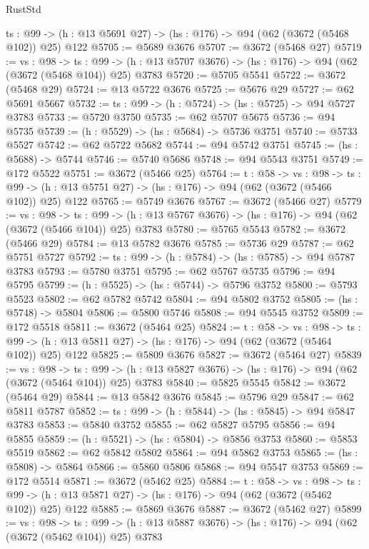 \begin{lexlean}{RustStd}
\begin{coremodule}
{\begin{coremodule}
{{{{{{{{{  {ts : @99} -> (h : @13 @5691 @27) -> (hs : @176) -> @94 (@62 (@3672 (@5468 @102)) @25) @122
@5705 := @5689 @3676
@5707 := @3672 (@5468 @27)
@5719 := {vs : @98} ->
  {ts : @99} -> (h : @13 @5707 @3676) -> (hs : @176) -> @94 (@62 (@3672 (@5468 @104)) @25) @3783
@5720 := @5705 @5541
@5722 := @3672 (@5468 @29)
@5724 := @13 @5722 @3676
@5725 := @5676 @29
@5727 := @62 @5691 @5667
@5732 := {ts : @99} -> (h : @5724) -> (hs : @5725) -> @94 @5727 @3783
@5733 := @5720 @3750
@5735 := @62 @5707 @5675
@5736 := @94 @5735
@5739 := (h : @5529) -> (hs : @5684) -> @5736 @3751
@5740 := @5733 @5527
@5742 := @62 @5722 @5682
@5744 := @94 @5742 @3751
@5745 := (hs : @5688) -> @5744
@5746 := @5740 @5686
@5748 := @94 @5543 @3751
@5749 := @172 @5522
@5751 := @3672 (@5466 @25)
@5764 := {t : @58} ->
  {vs : @98} ->
  {ts : @99} -> (h : @13 @5751 @27) -> (hs : @176) -> @94 (@62 (@3672 (@5466 @102)) @25) @122
@5765 := @5749 @3676
@5767 := @3672 (@5466 @27)
@5779 := {vs : @98} ->
  {ts : @99} -> (h : @13 @5767 @3676) -> (hs : @176) -> @94 (@62 (@3672 (@5466 @104)) @25) @3783
@5780 := @5765 @5543
@5782 := @3672 (@5466 @29)
@5784 := @13 @5782 @3676
@5785 := @5736 @29
@5787 := @62 @5751 @5727
@5792 := {ts : @99} -> (h : @5784) -> (hs : @5785) -> @94 @5787 @3783
@5793 := @5780 @3751
@5795 := @62 @5767 @5735
@5796 := @94 @5795
@5799 := (h : @5525) -> (hs : @5744) -> @5796 @3752
@5800 := @5793 @5523
@5802 := @62 @5782 @5742
@5804 := @94 @5802 @3752
@5805 := (hs : @5748) -> @5804
@5806 := @5800 @5746
@5808 := @94 @5545 @3752
@5809 := @172 @5518
@5811 := @3672 (@5464 @25)
@5824 := {t : @58} ->
  {vs : @98} ->
  {ts : @99} -> (h : @13 @5811 @27) -> (hs : @176) -> @94 (@62 (@3672 (@5464 @102)) @25) @122
@5825 := @5809 @3676
@5827 := @3672 (@5464 @27)
@5839 := {vs : @98} ->
  {ts : @99} -> (h : @13 @5827 @3676) -> (hs : @176) -> @94 (@62 (@3672 (@5464 @104)) @25) @3783
@5840 := @5825 @5545
@5842 := @3672 (@5464 @29)
@5844 := @13 @5842 @3676
@5845 := @5796 @29
@5847 := @62 @5811 @5787
@5852 := {ts : @99} -> (h : @5844) -> (hs : @5845) -> @94 @5847 @3783
@5853 := @5840 @3752
@5855 := @62 @5827 @5795
@5856 := @94 @5855
@5859 := (h : @5521) -> (hs : @5804) -> @5856 @3753
@5860 := @5853 @5519
@5862 := @62 @5842 @5802
@5864 := @94 @5862 @3753
@5865 := (hs : @5808) -> @5864
@5866 := @5860 @5806
@5868 := @94 @5547 @3753
@5869 := @172 @5514
@5871 := @3672 (@5462 @25)
@5884 := {t : @58} ->
  {vs : @98} ->
  {ts : @99} -> (h : @13 @5871 @27) -> (hs : @176) -> @94 (@62 (@3672 (@5462 @102)) @25) @122
@5885 := @5869 @3676
@5887 := @3672 (@5462 @27)
@5899 := {vs : @98} ->
  {ts : @99} -> (h : @13 @5887 @3676) -> (hs : @176) -> @94 (@62 (@3672 (@5462 @104)) @25) @3783
}}}}}}}}}
\end{coremodule}}
\end{coremodule}
\end{lexlean}

